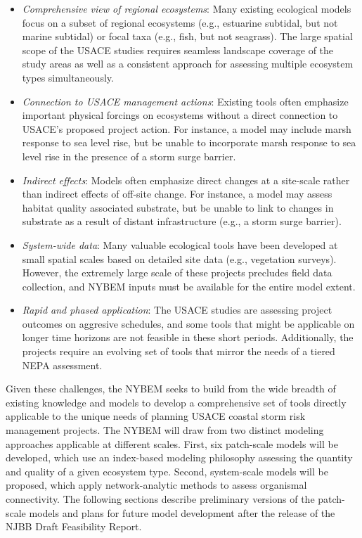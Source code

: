 \documentclass[
]{book}
\providecommand{\tightlist}{%
  \setlength{\itemsep}{0pt}\setlength{\parskip}{0pt}}
\begin{document}
\begin{itemize}
\tightlist
\item
  \emph{Comprehensive view of regional ecosystems}: Many existing ecological models focus on a subset of regional ecosystems (e.g., estuarine subtidal, but not marine subtidal) or focal taxa (e.g., fish, but not seagrass). The large spatial scope of the USACE studies requires seamless landscape coverage of the study areas as well as a consistent approach for assessing multiple ecosystem types simultaneously.\\
\item
  \emph{Connection to USACE management actions}: Existing tools often emphasize important physical forcings on ecosystems without a direct connection to USACE's proposed project action. For instance, a model may include marsh response to sea level rise, but be unable to incorporate marsh response to sea level rise in the presence of a storm surge barrier.\\
\item
  \emph{Indirect effects}: Models often emphasize direct changes at a site-scale rather than indirect effects of off-site change. For instance, a model may assess habitat quality associated substrate, but be unable to link to changes in substrate as a result of distant infrastructure (e.g., a storm surge barrier).\\
\item
  \emph{System-wide data}: Many valuable ecological tools have been developed at small spatial scales based on detailed site data (e.g., vegetation surveys). However, the extremely large scale of these projects precludes field data collection, and NYBEM inputs must be available for the entire model extent.\\
\item
  \emph{Rapid and phased application}: The USACE studies are assessing project outcomes on aggresive schedules, and some tools that might be applicable on longer time horizons are not feasible in these short periods. Additionally, the projects require an evolving set of tools that mirror the needs of a tiered NEPA assessment.
\end{itemize}

Given these challenges, the NYBEM seeks to build from the wide breadth of existing knowledge and models to develop a comprehensive set of tools directly applicable to the unique needs of planning USACE coastal storm risk management projects. The NYBEM will draw from two distinct modeling approaches applicable at different scales. First, six patch-scale models will be developed, which use an index-based modeling philosophy assessing the quantity and quality of a given ecosystem type. Second, system-scale models will be proposed, which apply network-analytic methods to assess organismal connectivity. The following sections describe preliminary versions of the patch-scale models and plans for future model development after the release of the NJBB Draft Feasibility Report.
\end{document}
